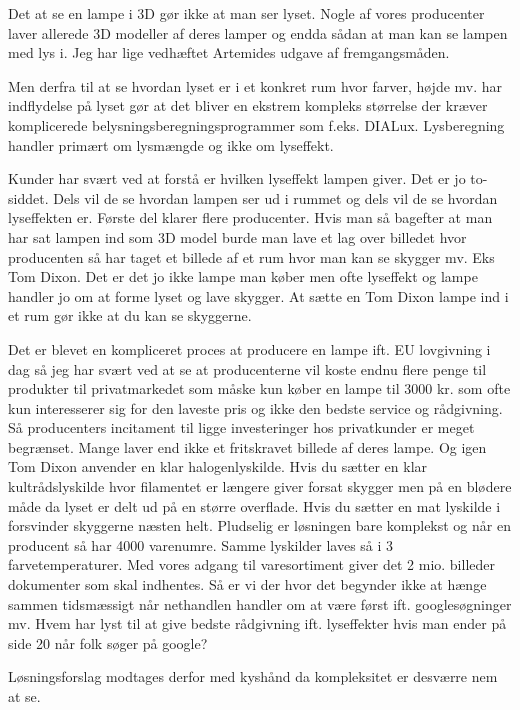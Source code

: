 \documentclass[oneside,a4paper,titlepage]{article}
\begin{document}
Det at se en lampe i 3D gør ikke at man ser lyset. Nogle af vores producenter laver allerede 3D modeller af deres lamper og endda sådan at man kan se lampen med lys i. Jeg har lige vedhæftet Artemides udgave af fremgangsmåden.

Men derfra til at se hvordan lyset er i et konkret rum hvor farver, højde mv. har indflydelse på lyset gør at det bliver en ekstrem kompleks størrelse der kræver komplicerede belysningsberegningsprogrammer som f.eks. DIALux. Lysberegning handler primært om lysmængde og ikke om lyseffekt.

Kunder har svært ved at forstå er hvilken lyseffekt lampen giver. Det er jo to-siddet. Dels vil de se hvordan lampen ser ud i rummet og dels vil de se hvordan lyseffekten er. Første del klarer flere producenter. Hvis man så bagefter at man har sat lampen ind som 3D model burde man lave et lag over billedet hvor producenten så har taget et billede af et rum hvor man kan se skygger mv. Eks Tom Dixon. Det er det jo ikke lampe man køber men ofte lyseffekt og lampe handler jo om at forme lyset og lave skygger. At sætte en Tom Dixon lampe ind i et rum gør ikke at du kan se skyggerne.

Det er blevet en kompliceret proces at producere en lampe ift. EU lovgivning i dag så jeg har svært ved at se at producenterne vil koste endnu flere penge til produkter til privatmarkedet som måske kun køber en lampe til 3000 kr. som ofte kun interesserer sig for den laveste pris og ikke den bedste service og rådgivning. Så producenters incitament til ligge investeringer hos privatkunder er meget begrænset. Mange laver end ikke et fritskravet billede af deres lampe. Og igen Tom Dixon anvender en klar halogenlyskilde. Hvis du sætter en klar kultrådslyskilde hvor filamentet er længere giver forsat skygger men på en blødere måde da lyset er delt ud på en større overflade. Hvis du sætter en mat lyskilde i forsvinder skyggerne næsten helt. Pludselig er løsningen bare komplekst og når en producent så har 4000 varenumre. Samme lyskilder laves så i 3 farvetemperaturer. Med vores adgang til varesortiment giver det 2 mio. billeder dokumenter som skal indhentes. Så er vi der hvor det begynder ikke at hænge sammen tidsmæssigt når nethandlen handler om at være først ift. googlesøgninger mv. Hvem har lyst til at give bedste rådgivning ift. lyseffekter hvis man ender på side 20 når folk søger på google?  

Løsningsforslag modtages derfor med kyshånd da kompleksitet er desværre nem at se. 
\end{document}
